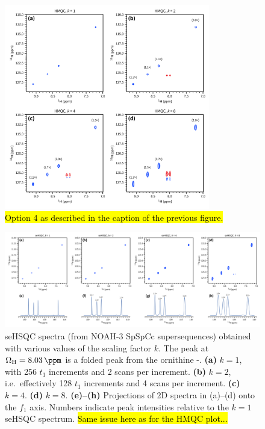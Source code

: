 \begin{figure}
    \centering
    \includegraphics[width=0.8\textwidth]{./figures/hmqc_kscale_2donly.png}
    \caption{
        \hl{Option 4 as described in the caption of the previous figure.}
    }
    \label{fig:hmqc_kscale_2donly}
\end{figure}

\begin{figure}
    \centering
    \includegraphics[width=\textwidth]{./figures/spv2_kscale.png}
    \caption{
        \nitrogen{} seHSQC spectra (from NOAH-3 SpSpCc supersequences) obtained with various values of the scaling factor $k$.
        The peak at $\Omega_{\ce{H}} = \SI{8.03}{\ppm}$ is a folded peak from the ornithine \textdelta-.
        \textbf{(a)} $k = 1$, with 256 $t_1$ increments and 2 scans per increment.
        \textbf{(b)} $k = 2$, i.e.\ effectively 128 $t_1$ increments and 4 scans per increment.
        \textbf{(c)} $k = 4$.
        \textbf{(d)} $k = 8$.
        \textbf{(e)--(h)} Projections of 2D spectra in (a)--(d) onto the $f_1$ axis.
        Numbers indicate peak intensities relative to the $k = 1$ seHSQC spectrum.
        \grami{}
        \hl{Same issue here as for the HMQC plot...}
    }
    \label{fig:spv2_kscale}
\end{figure}

